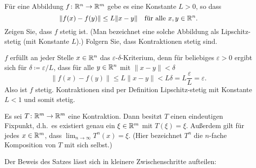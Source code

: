 \documentclass[a4paper,10pt]{article}
\begin{document}
\begin{question}
 Für eine Abbildung $f \colon \mathbb{R}^n \to \mathbb{R}^m$ gebe es eine Konstante $L > 0$, so dass
 \[
  \|f(x)-f(y)\| \leq L\|x-y\| \quad \text{für alle $x,y \in \mathbb{R}^n$}.
 \]
 Zeigen Sie, dass $f$ stetig ist. (Man bezeichnet eine solche Abbildung als Lipschitz-stetig (mit Konstante $L$).) Folgern Sie, dass Kontraktionen stetig sind.
\end{question}
\begin{solution}
 $f$ erfüllt an jeder Stelle $x \in \mathbb{R}^n$ das $\varepsilon$-$\delta$-Kriterium, denn für beliebiges $\varepsilon > 0$ ergibt sich für $\delta \coloneqq \varepsilon/L$, dass für alle $y \in \mathbb{R}^n$ mit $\|x-y\| < \delta$
 \[
  \|f(x)-f(y)\| \leq L\|x-y\| < L\delta = L \frac{\varepsilon}{L} = \varepsilon.
 \]
 Also ist $f$ stetig. Kontraktionen sind per Definition Lipschitz-stetig mit Konstante $L < 1$ und somit stetig.
\end{solution}


\begin{thrm}
 Es sei $T \colon \mathbb{R}^m \to \mathbb{R}^m$ eine Kontraktion. Dann besitzt $T$ einen eindeutigen Fixpunkt, d.h.\ es existiert genau ein $\xi \in \mathbb{R}^m$ mit $T(\xi) = \xi$. Außerdem gilt für jedes $x \in \mathbb{R}^m$, dass $\lim_{n \to \infty} T^n(x) = \xi$. (Hier bezeichnet $T^n$ die $n$-fache Komposition von $T$ mit sich selbst.)
\end{thrm}


Der Beweis des Satzes lässt sich in kleinere Zwischenschritte aufteilen:
\end{document}
